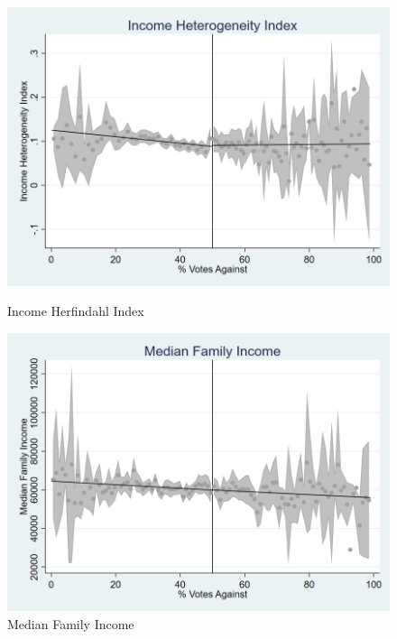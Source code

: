 \begin{figure}[ht]
    \begin{minipage}[b]{0.40\textwidth}
        \centering
        \includegraphics[width=\textwidth,keepaspectratio]{images/cov_smoothness_incherfindahl.png}
        \caption*{Income Herfindahl Index}
        \label{fig:incherfindahl_sm}
    \end{minipage}
    \hfill
    \begin{minipage}[b]{0.40\textwidth}
        \centering
        \includegraphics[width=\textwidth,keepaspectratio]{images/cov_smoothness_medfamy.png}
        \caption*{Median Family Income}
        \label{fig:medfamy_sm}
    \end{minipage}
    
    \vspace{1em}
    

\end{figure}
